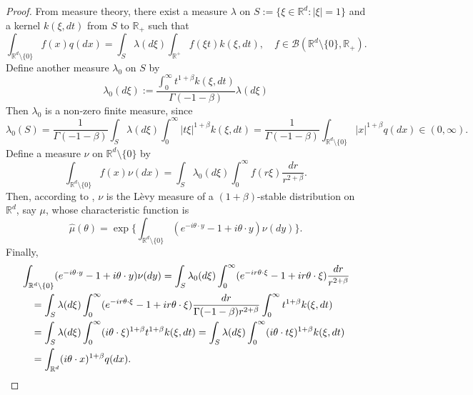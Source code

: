 \documentclass[12pt]{amsart}
\theoremstyle{plain}
\theoremstyle{definition}
\numberwithin{equation}{section}
\begin{document}
\begin{proof}
    From measure theory, there exist a measure $\lambda$ on $S:= \{\xi\in \mathbb R^d:|\xi| = 1\}$ and a kernel $k(\xi,dt)$ from $S$ to $\mathbb R_+$ such that
\[
    \int_{\mathbb R^d\setminus \{0\}} f(x)q(dx) = \int_S \lambda(d\xi) \int_{\mathbb R^+} f(\xi t)k(\xi,dt),\quad
    f\in \mathcal B(\mathbb R^d\setminus \{0\}, \mathbb R_+).
\]
    Define another measure $\lambda_0$ on $S$ by
\[
    \lambda_0(d\xi) := \frac{\int_0^\infty t^{1+\beta}k(\xi,dt)}{\Gamma(-1-\beta)} \lambda (d\xi)
\]
    Then $\lambda_0$ is a non-zero finite measure, since
\[
    \lambda_0(S) = \frac{1}{\Gamma(-1-\beta)} \int_S \lambda (d\xi) \int_0^\infty |t\xi|^{1+\beta}k(\xi,dt)
    = \frac{1}{\Gamma(-1-\beta)} \int_{\mathbb R^d\setminus\{0\}} |x|^{1+\beta} q(dx) \in (0,\infty).
\]
    Define a measure $\nu$ on $\mathbb R^d\setminus\{0\}$ by
\[
    \int_{\mathbb R^d\setminus\{0\}}f(x)\nu(dx)= \int_{S} \lambda_0(d\xi) \int_0^\infty f(r\xi) \frac{dr}{r^{2+\beta}} .
\]
    Then, according to \cite[Remark 14.4]{Sato1999Levy}, $\nu$ is the L\`evy measure of a $(1+\beta)$-stable distribution on $\mathbb R^d$, say $\mu$, whose characteristic function is \[\hat \mu(\theta)=\exp\Big\{\int_{\mathbb R^d\setminus\{0\}} (e^{-i\theta \cdot y}-1+i\theta \cdot y) \nu(dy)\Big\}.\]
Finally, 
\begin{align}
    &\int_{\mathbb R^d\setminus\{0\}} (e^{-i\theta \cdot y}-1+i\theta \cdot y) \nu(dy)
    = \int_S \lambda_0(d\xi) \int_0^\infty (e^{-ir\theta \cdot \xi}-1+ir\theta \cdot \xi) \frac{dr}{r^{2+\beta}}
\\&\quad = \int_S \lambda (d\xi) \int_0^\infty (e^{-ir\theta \cdot \xi}-1+ir\theta \cdot \xi) \frac{dr}{\Gamma(-1-\beta)r^{2+\beta}}\int_0^\infty t^{1+\beta} k(\xi,dt)
\\&\quad = \int_S \lambda (d\xi) \int_0^\infty (i\theta\cdot \xi)^{1+\beta} t^{1+\beta} k(\xi,dt)
= \int_S \lambda(d\xi) \int_0^\infty (i\theta \cdot t\xi)^{1+\beta} k(\xi,dt)
\\&\quad = \int_{\mathbb R^d} (i\theta \cdot x)^{1+\beta} q(dx).
\qedhere
\end{align}
\end{proof}
\end{document}
